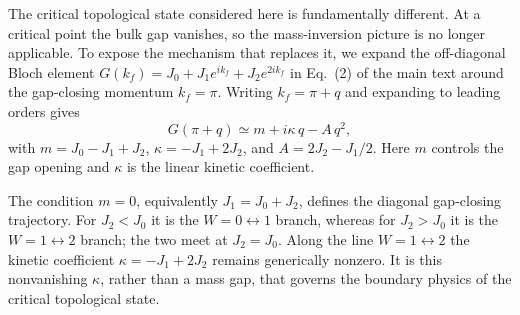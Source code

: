 \documentclass[aps,prl,twocolumn,preprintnumbers,amsmath,amssymb,superscriptaddress,10pt]{revtex4-2}
\begin{document}
The critical topological state considered here is fundamentally different. At a critical point the bulk gap vanishes, so the mass-inversion picture is no longer applicable. To expose the mechanism that replaces it, we expand the off-diagonal Bloch element
$G(k_f)=J_0+J_1 e^{ik_f}+J_2 e^{2ik_f}$ in Eq.~(2) of the main text around the gap-closing momentum $k_f=\pi$. Writing $k_f=\pi+q$ and expanding to leading orders gives
\begin{equation}
G(\pi+q)
\simeq
m+i\kappa\, q-A\,q^2 ,
\label{eq:SM_continuum_G}
\end{equation}
with $m=J_0-J_1+J_2$, $\kappa=-J_1+2J_2$, and $A=2J_2-J_1/2$.
Here $m$ controls the gap opening and $\kappa$ is the linear kinetic coefficient. 

The condition \(m=0\), equivalently \(J_1=J_0+J_2\), defines the diagonal gap-closing trajectory. For \(J_2<J_0\) it is the \(W=0\leftrightarrow1\) branch, whereas for \(J_2>J_0\) it is the $W=1\leftrightarrow2$ branch; the two meet at \(J_2=J_0\). Along the line $W=1\leftrightarrow2$ the kinetic coefficient $\kappa=-J_1+2J_2$ remains generically nonzero. It is this nonvanishing $\kappa$, rather than a mass gap, that governs the boundary physics of the critical topological state. 
\end{document}
